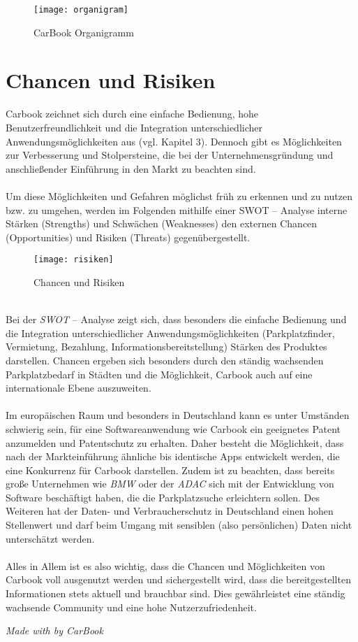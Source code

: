 \documentclass[12pt,ngerman, fleqn]{book} %
\begin{document}
\begin{figure}[ht]
    \centering
    \centerline{\texttt{[image: organigram]}}
    \caption{CarBook Organigramm}
    \label{fig:my_label}
\end{figure}

\section{Chancen und Risiken}
Carbook zeichnet sich durch eine einfache Bedienung, hohe Benutzerfreundlichkeit und die Integration unterschiedlicher Anwendungsmöglichkeiten aus (vgl. Kapitel 3). Dennoch gibt es Möglichkeiten zur Verbesserung und Stolpersteine, die bei der Unternehmensgründung und anschließender Einführung in den Markt zu beachten sind.\\ \\
Um diese Möglichkeiten und Gefahren möglichst früh zu erkennen und zu nutzen bzw. zu umgehen, werden im Folgenden mithilfe einer SWOT – Analyse interne Stärken (Strengths) und Schwächen (Weaknesses) den externen Chancen (Opportunities) und Risiken (Threats) gegenübergestellt.\\
\begin{figure}
    \centering
    \texttt{[image: risiken]}
    \caption{Chancen und Risiken}
    \label{fig:risiken}
\end{figure}\\
Bei der \emph{SWOT} – Analyse zeigt sich, dass besonders die einfache Bedienung und die Integration unterschiedlicher Anwendungsmöglichkeiten (Parkplatzfinder, Vermietung, Bezahlung, Informationsbereitstellung) Stärken des Produktes darstellen. Chancen ergeben sich besonders durch den ständig wachsenden Parkplatzbedarf in Städten und die Möglichkeit, Carbook auch auf eine internationale Ebene auszuweiten.\\ \\
Im europäischen Raum und besonders in Deutschland kann es unter Umständen schwierig sein, für eine Softwareanwendung wie Carbook ein geeignetes Patent anzumelden und Patentschutz zu erhalten. Daher besteht die Möglichkeit, dass nach der Markteinführung ähnliche bis identische Apps entwickelt werden, die eine Konkurrenz für Carbook darstellen. Zudem ist zu beachten, dass bereits große Unternehmen wie \emph{BMW} oder der \emph{ADAC} sich mit der Entwicklung von Software beschäftigt haben, die die Parkplatzsuche erleichtern sollen. Des Weiteren hat der Daten- und Verbraucherschutz in Deutschland einen hohen Stellenwert und darf beim Umgang mit sensiblen (also persönlichen) Daten nicht unterschätzt werden.\\ \\
Alles in Allem ist es also wichtig, dass die Chancen und Möglichkeiten von Carbook voll ausgenutzt werden und sichergestellt wird, dass die bereitgestellten Informationen stets aktuell und brauchbar sind. Dies gewährleistet eine ständig wachsende Community und eine hohe Nutzerzufriedenheit.




\vfill
\textit{Made with  by CarBook} \autocite{acknow}
\end{document}
